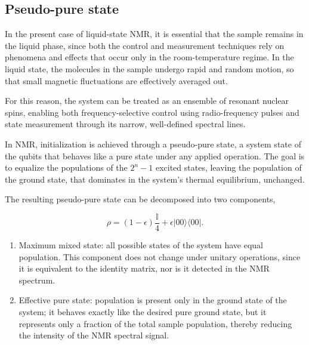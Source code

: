 \subsection{Pseudo-pure state}
\label{subsec:pseudo_pure_state}

In the present case of liquid-state NMR, it is essential that the sample remains in the liquid phase, since both the control and measurement techniques rely on phenomena and effects that occur only in the room-temperature regime. In the liquid state, the molecules in the sample undergo rapid and random motion, so that small magnetic fluctuations are effectively averaged out.

For this reason, the system can be treated as an ensemble of resonant nuclear spins, enabling both frequency-selective control using radio-frequency pulses and state measurement through its narrow, well-defined spectral lines.

In NMR, initialization is achieved through a pseudo-pure state, a system state of the qubits that behaves like a pure state under any applied operation. The goal is to equalize the populations of the \(2^n - 1\) excited states, leaving the population of the ground state, that dominates in the system’s thermal equilibrium, unchanged.

The resulting pseudo-pure state can be decomposed into two components,

\begin{equation}
    \rho = (1-\epsilon)\frac{\mathbb{I}}{4} + \epsilon \lvert 00\rangle\langle 00 \rvert.
\end{equation}

\begin{enumerate}
    \item Maximum mixed state: all possible states of the system have equal population. This component does not change under unitary operations, since it is equivalent to the identity matrix, nor is it detected in the NMR spectrum.
    
    \item Effective pure state: population is present only in the ground state of the system; it behaves exactly like the desired pure ground state, but it represents only a fraction of the total sample population, thereby reducing the intensity of the NMR spectral signal.
\end{enumerate}

